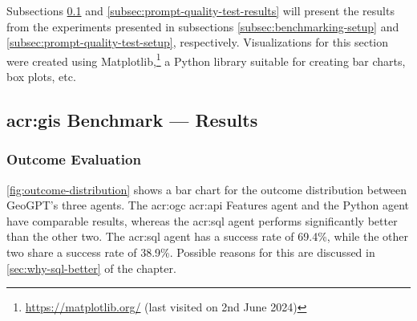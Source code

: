 \begin{comment}
Results should be clearly displayed and should provide a suitable representation of your results for the points you wish to make.
Graphs should be labelled in a legible font. If more than one result is displayed in the same graph, then these should be clearly marked.
Please choose carefully rather than presenting every result. Too much information is hard to read and often hides the key information you wish to present. Make use of statistical methods when presenting results, where possible to strengthen the results.
Further, the format of the presentation of results should be chosen based on what issues in the results you wish to highlight.
You may wish to present a subset in the experimental section and provide additional results in an appendix.
Point out specifics here but save the overall/general discussion to the Discussion chapter.
\end{comment}

Subsections \ref{subsec:quantitative-results} and \ref{subsec:prompt-quality-test-results} will present the results from the experiments presented in subsections \ref{subsec:benchmarking-setup} and \ref{subsec:prompt-quality-test-setup}, respectively. Visualizations for this section were created using Matplotlib,\footnote{\url{https://matplotlib.org/} (last visited on 2nd June 2024)} a Python library suitable for creating bar charts, box plots, etc.


\subsection[GIS Benchmark Experiment --- Results]{\acrshort{acr:gis} Benchmark --- Results}
\label{subsec:quantitative-results}

\subsubsection{Outcome Evaluation}

\autoref{fig:outcome-distribution} shows a bar chart for the outcome distribution between GeoGPT's three agents. The \acrshort{acr:ogc} \acrshort{acr:api} Features agent and the Python agent have comparable results, whereas the \acrshort{acr:sql} agent performs significantly better than the other two. The \acrshort{acr:sql} agent has a success rate of 69.4\%, while the other two share a success rate of 38.9\%. Possible reasons for this are discussed in \autoref{sec:why-sql-better} of the  chapter.

